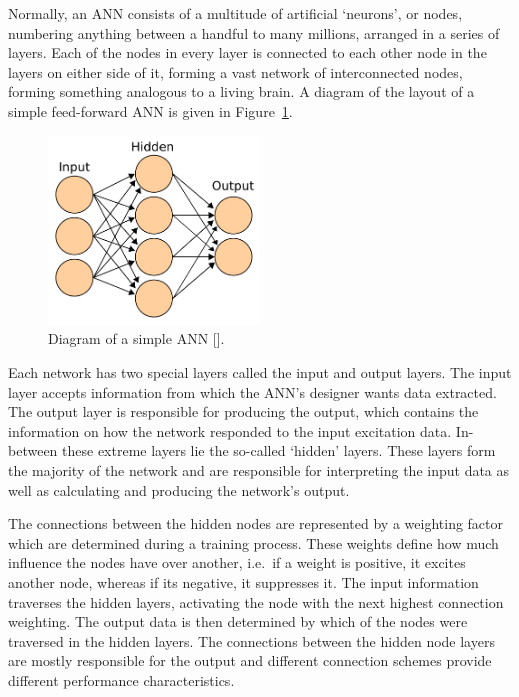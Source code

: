 Normally, an ANN consists of a multitude of artificial `neurons', or nodes, numbering anything between a handful to many millions, arranged in a series of layers. Each of the nodes in every layer is connected to each other node in the layers on either side of it, forming a vast network of interconnected nodes, forming something analogous to a living brain. A diagram of the layout of a simple feed-forward ANN is given in Figure~\ref{fig:chap2-ann-layout}.

\begin{figure}
  \centering
  \includegraphics[width=0.5\textwidth]{figures/chapter2/ANN_diagram}
  \caption[Diagram of a simple ANN.]{Diagram of a simple ANN [\cite{ann-wiki-pic}].}
\label{fig:chap2-ann-layout}
\end{figure}

Each network has two special layers called the input and output layers. The input layer accepts information from which the ANN's designer wants data extracted. The output layer is responsible for producing the output, which contains the information on how the network responded to the input excitation data. In-between these extreme layers lie the so-called `hidden' layers. These layers form the majority of the network and are responsible for interpreting the input data as well as calculating and producing the network's output. 

The connections between the hidden nodes are represented by a weighting factor which are determined during a training process. These weights define how much influence the nodes have over another, i.e.\ if a weight is positive, it excites another node, whereas if its negative, it suppresses it. The input information traverses the hidden layers, activating the node with the next highest connection weighting. The output data is then determined by which of the nodes were traversed in the hidden layers. The connections between the hidden node layers are mostly responsible for the output and different connection schemes provide different performance characteristics. 

